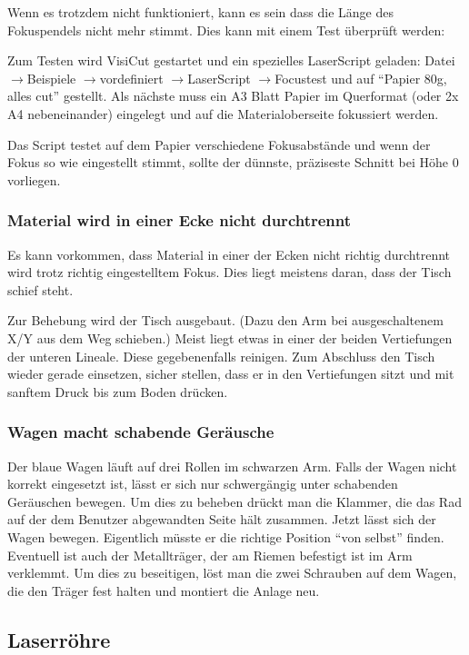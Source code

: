 \documentclass{\basedir/fablab-document}
\newcommand{\pfeil}{\ensuremath{\rightarrow}}
\begin{document}
	Wenn es trotzdem nicht funktioniert, kann es sein dass die Länge des Fokuspendels nicht mehr stimmt. Dies kann mit einem Test überprüft werden:
	
	Zum Testen wird VisiCut gestartet und ein spezielles LaserScript geladen: Datei \pfeil Beispiele \pfeil vordefiniert \pfeil LaserScript \pfeil Focustest und auf \enquote{Papier 80g, alles cut} gestellt.
	Als nächste muss ein A3 Blatt Papier im Querformat (oder 2x A4 nebeneinander) eingelegt und auf die Materialoberseite fokussiert werden.
	
	Das Script testet auf dem Papier verschiedene Fokusabstände und wenn der Fokus so wie eingestellt stimmt, sollte der dünnste, präziseste Schnitt bei Höhe 0 vorliegen.
	
	
	\subsubsection{Material wird in einer Ecke nicht durchtrennt}
	Es kann vorkommen, dass Material in einer der Ecken nicht richtig durchtrennt wird trotz richtig eingestelltem Fokus. Dies liegt meistens daran, dass der Tisch schief steht.
	
	Zur Behebung wird der Tisch ausgebaut. (Dazu den Arm bei ausgeschaltenem X/Y aus dem Weg schieben.) Meist liegt etwas in einer der beiden Vertiefungen der unteren Lineale. Diese gegebenenfalls reinigen. Zum Abschluss den Tisch wieder gerade einsetzen, sicher stellen, dass er in den Vertiefungen sitzt und mit sanftem Druck bis zum Boden drücken.
	
	\subsubsection{Wagen macht schabende Geräusche}
	Der blaue Wagen läuft auf drei Rollen im schwarzen Arm. Falls der Wagen nicht korrekt eingesetzt ist, lässt er sich nur schwergängig unter schabenden Geräuschen bewegen. Um dies zu beheben drückt man die Klammer, die das Rad auf der dem Benutzer abgewandten Seite hält zusammen. Jetzt lässt sich der Wagen bewegen. Eigentlich müsste er die richtige Position \enquote{von selbst} finden. Eventuell ist auch der Metallträger, der am Riemen befestigt ist im Arm verklemmt. Um dies zu beseitigen, löst man die zwei Schrauben auf dem Wagen, die den Träger fest halten und montiert die Anlage neu.
	
	\subsection{Laserröhre}
\end{document}
